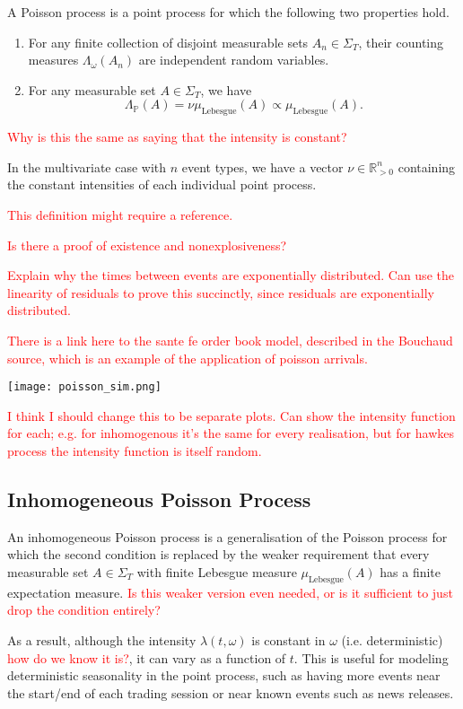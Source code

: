 \documentclass[honours,12pt]{unswthesis}
\numberwithin{equation}{section}
\begin{document}
A Poisson process is a point process for which the following two properties hold.
\begin{enumerate}
	\item For any finite collection of disjoint measurable sets $A_n\in\Sigma_T$, their counting measures $\Lambda_\omega(A_n)$ are independent random variables.
	\item For any measurable set $A\in\Sigma_T$, we have $$\Lambda_{\mathbb P}(A) = \nu \mu_{\mathrm{Lebesgue}}(A)\propto\mu_{\mathrm{Lebesgue}}(A).$$
\end{enumerate}
\textcolor{red}{Why is this the same as saying that the intensity is constant?}

In the multivariate case with $n$ event types, we have a vector $\nu\in\mathbb{R}_{>0}^n$ containing the constant intensities of each individual point process.

\textcolor{red}{This definition might require a reference.}

\textcolor{red}{Is there a proof of existence and nonexplosiveness?}

\textcolor{red}{Explain why the times between events are exponentially distributed. Can use the linearity of residuals to prove this succinctly, since residuals are exponentially distributed.}

\textcolor{red}{There is a link here to the sante fe order book model, described in the Bouchaud source, which is an example of the application of poisson arrivals.}

\texttt{[image: poisson\_sim.png]}

\textcolor{red}{I think I should change this to be separate plots. Can show the intensity function for each; e.g. for inhomogenous it's the same for every realisation, but for hawkes process the intensity function is itself random.}

\subsection{Inhomogeneous Poisson Process}
An inhomogeneous Poisson process is a generalisation of the Poisson process for which the second condition is replaced by the weaker requirement that every measurable set $A\in\Sigma_T$ with finite Lebesgue measure $\mu_{\mathrm{Lebesgue}}(A)$ has a finite expectation measure. \textcolor{red}{Is this weaker version even needed, or is it sufficient to just drop the condition entirely?}

As a result, although the intensity $\lambda(t,\omega)$ is constant in $\omega$ (i.e. deterministic) \textcolor{red}{how do we know it is?}, it can vary as a function of $t$. This is useful for modeling deterministic seasonality in the point process, such as having more events near the start/end of each trading session or near known events such as news releases.
\end{document}
